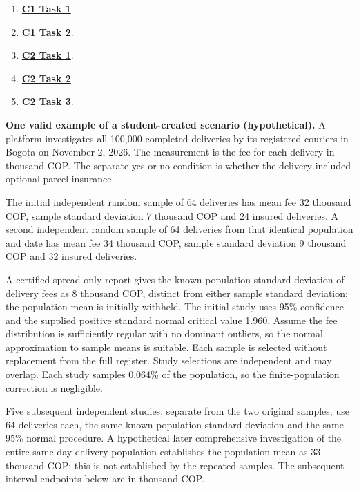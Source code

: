 \begin{enumerate}[label=(\alph*),itemsep=6pt]
\item \hyperref[sol:p3c1a]{\textbf{C1 Task 1}}. \cOneA\ 
\item \hyperref[sol:p3c1b]{\textbf{C1 Task 2}}. \cOneB\ 
\item \hyperref[sol:p3c2a]{\textbf{C2 Task 1}}. \cTwoA\ 
\item \hyperref[sol:p3c2b]{\textbf{C2 Task 2}}. \cTwoB\ 
\item \hyperref[sol:p3c2c]{\textbf{C2 Task 3}}. \cTwoC\ 
\end{enumerate}
\secInicio[][sec:p3]

\clearpage

\textbf{One valid example of a student-created scenario (hypothetical).}
A platform investigates all 100,000 completed deliveries by its registered couriers in Bogota on November 2, 2026. The measurement is the fee for each delivery in thousand COP. The separate yes-or-no condition is whether the delivery included optional parcel insurance.

The initial independent random sample of 64 deliveries has mean fee 32 thousand COP, sample standard deviation 7 thousand COP and 24 insured deliveries. A second independent random sample of 64 deliveries from that identical population and date has mean fee 34 thousand COP, sample standard deviation 9 thousand COP and 32 insured deliveries.

A certified spread-only report gives the known population standard deviation of delivery fees as 8 thousand COP, distinct from either sample standard deviation; the population mean is initially withheld. The initial study uses 95\% confidence and the supplied positive standard normal critical value 1.960. Assume the fee distribution is sufficiently regular with no dominant outliers, so the normal approximation to sample means is suitable. Each sample is selected without replacement from the full register. Study selections are independent and may overlap. Each study samples 0.064\% of the population, so the finite-population correction is negligible.

Five subsequent independent studies, separate from the two original samples, use 64 deliveries each, the same known population standard deviation and the same 95\% normal procedure. A hypothetical later comprehensive investigation of the entire same-day delivery population establishes the population mean as 33 thousand COP; this is not established by the repeated samples. The subsequent interval endpoints below are in thousand COP.

